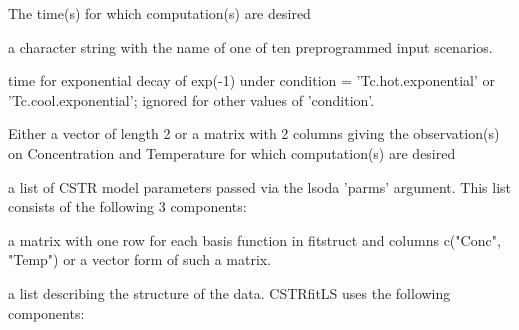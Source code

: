\documentclass{article}
\begin{document}
\begin{Arguments}
\begin{ldescription}
\item[\code{Time}] The time(s) for which computation(s) are desired

\item[\code{condition}] a character string with the name of one of ten preprogrammed input
scenarios.  

\item[\code{ tau }] time for exponential decay of exp(-1) under condition =
'Tc.hot.exponential' or 'Tc.cool.exponential';  ignored for other
values of 'condition'. 

\item[\code{y}] Either a vector of length 2 or a matrix with 2 columns giving the
observation(s) on Concentration and Temperature for which
computation(s) are desired  

\item[\code{parms}] a list of CSTR model parameters passed via the lsoda 'parms'
argument.  This list consists of the following 3 components:  


\item[\code{coef}] a matrix with one row for each basis function in fitstruct and
columns c("Conc", "Temp") or a vector form of such a matrix.  

\item[\code{datstruct}] a list describing the structure of the data.  CSTRfitLS uses the
following components:

\end{ldescription}
\end{Arguments}
\end{document}
